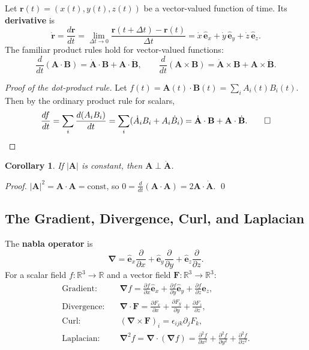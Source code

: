 \documentclass[12pt,a4paper]{article}
\theoremstyle{plain}
\newtheorem{corollary}[theorem]{Corollary}
\theoremstyle{definition}
\theoremstyle{remark}
\newcommand{\R}{\mathbb{R}}
\newcommand{\ve}[1]{\mathbf{#1}}           %
\newcommand{\he}[1]{\hat{\mathbf{#1}}}     %
\newcommand{\rv}{\ve{r}}
\newcommand{\nab}{\boldsymbol{\nabla}}
\begin{document}
Let $\rv(t) = (x(t),y(t),z(t))$ be a vector-valued function of time. Its \textbf{derivative} is
\[
  \dot{\rv}
  = \frac{d\rv}{dt}
  = \lim_{\Delta t\to 0}\frac{\rv(t+\Delta t)-\rv(t)}{\Delta t}
  = \dot{x}\,\he{e}_x + \dot{y}\,\he{e}_y + \dot{z}\,\he{e}_z.
\]
The familiar product rules hold for vector-valued functions:
\[
  \frac{d}{dt}(\ve{A}\cdot\ve{B}) = \dot{\ve{A}}\cdot\ve{B} + \ve{A}\cdot\dot{\ve{B}},
  \qquad
  \frac{d}{dt}(\ve{A}\times\ve{B}) = \dot{\ve{A}}\times\ve{B} + \ve{A}\times\dot{\ve{B}}.
\]

\begin{proof}[Proof of the dot-product rule]
Let $f(t) = \ve{A}(t)\cdot\ve{B}(t) = \sum_i A_i(t)B_i(t)$. Then by the ordinary product rule for scalars,
\[
  \frac{df}{dt}
  = \sum_i \frac{d(A_i B_i)}{dt}
  = \sum_i (\dot{A}_i B_i + A_i \dot{B}_i)
  = \dot{\ve{A}}\cdot\ve{B} + \ve{A}\cdot\dot{\ve{B}}. \qed
\]
\end{proof}

\begin{corollary}
If\/ $|\ve{A}|$ is constant, then $\ve{A}\perp\dot{\ve{A}}$.
\end{corollary}
\begin{proof}
$|\ve{A}|^2 = \ve{A}\cdot\ve{A} = \mathrm{const}$, so $0 = \frac{d}{dt}(\ve{A}\cdot\ve{A}) = 2\ve{A}\cdot\dot{\ve{A}}$. \qed
\end{proof}

\subsection{The Gradient, Divergence, Curl, and Laplacian}

The \textbf{nabla operator} is
\[
  \nab = \he{e}_x\frac{\partial}{\partial x} + \he{e}_y\frac{\partial}{\partial y} + \he{e}_z\frac{\partial}{\partial z}.
\]
For a scalar field $f:\R^3\to\R$ and a vector field $\ve{F}:\R^3\to\R^3$:
\begin{align*}
  \text{Gradient:}\quad
  &\nab f = \frac{\partial f}{\partial x}\he{e}_x + \frac{\partial f}{\partial y}\he{e}_y + \frac{\partial f}{\partial z}\he{e}_z,\\[4pt]
  \text{Divergence:}\quad
  &\nab\cdot\ve{F} = \frac{\partial F_x}{\partial x}+\frac{\partial F_y}{\partial y}+\frac{\partial F_z}{\partial z},\\[4pt]
  \text{Curl:}\quad
  &(\nab\times\ve{F})_i = \epsilon_{ijk}\partial_j F_k,\\[4pt]
  \text{Laplacian:}\quad
  &\nab^2 f = \nab\cdot(\nab f) = \frac{\partial^2 f}{\partial x^2}+\frac{\partial^2 f}{\partial y^2}+\frac{\partial^2 f}{\partial z^2}.
\end{align*}
\end{document}
